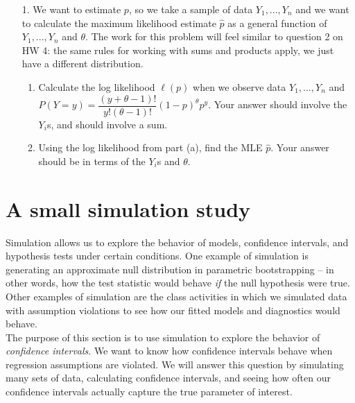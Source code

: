 \documentclass[11pt]{article}
\begin{document}
\begin{enumerate}

\item[1.] We want to estimate $p$, so we take a sample of data $Y_1,...,Y_n$ and we want to calculate the maximum likelihood estimate $\widehat{p}$ as a general function of $Y_1,...,Y_n$ and $\theta$. The work for this problem will feel similar to question 2 on HW 4: the same rules for working with sums and products apply, we just have a different distribution.

\begin{enumerate}
\item Calculate the log likelihood $\ell(p)$ when we observe data $Y_1,...,Y_n$ and $P(Y = y) = \dfrac{(y + \theta  - 1)!}{y!(\theta - 1)!} (1 - p)^\theta p^y$. Your answer should involve the $Y_i$s, and should involve a sum. 

\item Using the log likelihood from part (a), find the MLE $\widehat{p}$. Your answer should be in terms of the $Y_i$s and $\theta$.
\end{enumerate}
\end{enumerate}

\vspace{1cm}

\section{A small simulation study}

Simulation allows us to explore the behavior of models, confidence intervals, and hypothesis tests under certain conditions. One example of simulation is generating an approximate null distribution in parametric bootstrapping -- in other words, how the test statistic would behave \textit{if} the null hypothesis were true. Other examples of simulation are the class activities in which we simulated data with assumption violations to see how our fitted models and diagnostics would behave.\\

\noindent The purpose of this section is to use simulation to explore the behavior of \textit{confidence intervals}. We want to know how confidence intervals behave when regression assumptions are violated. We will answer this question by simulating many sets of data, calculating confidence intervals, and seeing how often our confidence intervals actually capture the true parameter of interest.
\end{document}
